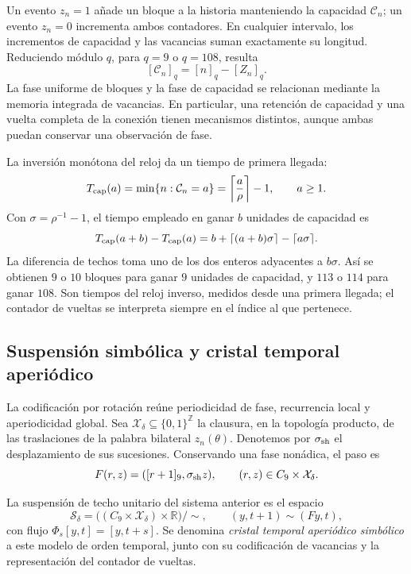 Un evento \(z_n=1\) añade un bloque a la historia manteniendo la capacidad
\(\mathcal C_n\); un evento \(z_n=0\) incrementa ambos contadores. En
cualquier intervalo, los incrementos de capacidad y las vacancias suman
exactamente su longitud. Reduciendo módulo \(q\), para \(q=9\) o
\(q=108\), resulta
\[
 [\mathcal C_n]_q=[n]_q-[Z_n]_q.
\]
La fase uniforme de bloques y la fase de capacidad se relacionan mediante
la memoria integrada de vacancias. En particular, una retención de
capacidad y una vuelta completa de la conexión tienen mecanismos
distintos, aunque ambas puedan conservar una observación de fase.

La inversión monótona del reloj da un tiempo de primera llegada:
\[
 T_{\rm cap}(a)=\min\{n:\mathcal C_n=a\}
 =\left\lceil\frac a\rho\right\rceil-1,
 \qquad a\geq1.
\]
Con \(\sigma=\rho^{-1}-1\), el tiempo empleado en ganar \(b\) unidades
de capacidad es
\[
 T_{\rm cap}(a+b)-T_{\rm cap}(a)
 =b+\lceil(a+b)\sigma\rceil-\lceil a\sigma\rceil.
\]
La diferencia de techos toma uno de los dos enteros adyacentes a
\(b\sigma\). Así se obtienen \(9\) o \(10\) bloques para ganar
\(9\) unidades de capacidad, y \(113\) o \(114\) para ganar \(108\).
Son tiempos del reloj inverso, medidos desde una primera llegada; el
contador de vueltas se interpreta siempre en el índice al que pertenece.

\subsection{Suspensión simbólica y cristal temporal aperiódico}
\label{mono-ampl:cristal}

La codificación por rotación reúne periodicidad de fase, recurrencia local
y aperiodicidad global. Sea \(\mathcal X_\delta\subseteq\{0,1\}^{\mathbb Z}\)
la clausura, en la topología producto, de las traslaciones de la palabra
bilateral \(z_n(\theta)\). Denotemos por \(\sigma_{\rm sh}\) el
desplazamiento de sus sucesiones. Conservando una fase nonádica, el paso es
\[
 F(r,z)=([r+1]_9,\sigma_{\rm sh}z),\qquad
 (r,z)\in C_9\times\mathcal X_\delta.
\]

\begin{definition}
\label{mono-ampl:def-cristal}
La suspensión de techo unitario del sistema anterior es el espacio
\[
 \mathcal S_\delta=
 \bigl((C_9\times\mathcal X_\delta)\times\mathbb R\bigr)/\sim,
 \qquad (y,t+1)\sim(Fy,t),
\]
con flujo \(\Phi_s[y,t]=[y,t+s]\). Se denomina \emph{cristal temporal
aperiódico simbólico} a este modelo de orden temporal, junto con su
codificación de vacancias y la representación del contador de vueltas.
\end{definition}

